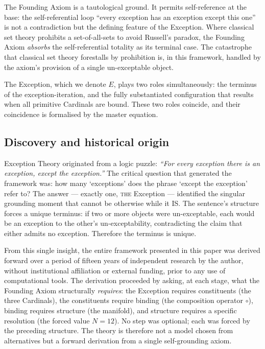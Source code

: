 \documentclass[11pt,a4paper]{article}
\theoremstyle{definition}
\theoremstyle{remark}
\begin{document}
The Founding Axiom is a tautological ground. It permits self-reference at the base: the self-referential loop ``every exception has an exception except this one'' is not a contradiction but the defining feature of the Exception. Where classical set theory prohibits a set-of-all-sets to avoid Russell's paradox, the Founding Axiom \emph{absorbs} the self-referential totality as its terminal case. The catastrophe that classical set theory forestalls by prohibition is, in this framework, handled by the axiom's provision of a single un-exceptable object.

The Exception, which we denote $E$, plays two roles simultaneously: the terminus of the exception-iteration, and the fully substantiated configuration that results when all primitive Cardinals are bound. These two roles coincide, and their coincidence is formalised by the master equation.

\subsection{Discovery and historical origin}\label{subsec:origin}

Exception Theory originated from a logic puzzle: \emph{``For every exception there is an exception, except the exception.''} The critical question that generated the framework was: how many `exceptions' does the phrase `except the exception' refer to? The answer --- exactly one, \textsc{the} Exception --- identified the singular grounding moment that cannot be otherwise while it IS. The sentence's structure forces a unique terminus: if two or more objects were un-exceptable, each would be an exception to the other's un-exceptability, contradicting the claim that either admits no exception. Therefore the terminus is unique.

From this single insight, the entire framework presented in this paper was derived forward over a period of fifteen years of independent research by the author, without institutional affiliation or external funding, prior to any use of computational tools. The derivation proceeded by asking, at each stage, what the Founding Axiom structurally \emph{requires}: the Exception requires constituents (the three Cardinals), the constituents require binding (the composition operator $\circ$), binding requires structure (the manifold), and structure requires a specific resolution (the forced value $N = 12$). No step was optional; each was forced by the preceding structure. The theory is therefore not a model chosen from alternatives but a forward derivation from a single self-grounding axiom.
\end{document}
